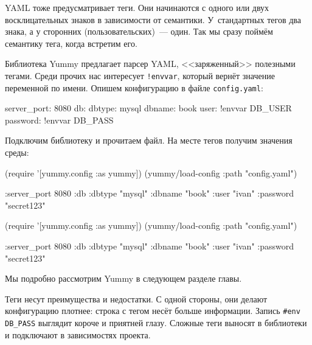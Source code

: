 YAML тоже предусматривает теги. Они начинаются с одного или двух восклицательных
знаков в зависимости от семантики. У~стандартных тегов два знака, а у сторонних
(пользовательских)~--- один. Так мы сразу поймём семантику тега, когда встретим
его.


Библиотека Yummy предлагает парсер YAML, <<заряженный>> полезными тегами. Среди
прочих нас интересует \verb|!envvar|, который вернёт значение переменной по
имени. Опишем конфигурацию в файле \verb|config.yaml|:

\begin{english}
  \begin{yaml}
server_port: 8080
db:
  dbtype:   mysql
  dbname:   book
  user:     !envvar DB_USER
  password: !envvar DB_PASS
  \end{yaml}
\end{english}

Подключим библиотеку и прочитаем файл. На месте тегов получим значения среды:

\ifnarrow

\begin{english}
  \begin{clojure}
(require '[yummy.config :as yummy])
(yummy/load-config
  {:path "config.yaml"})

{:server_port 8080
 :db {:dbtype "mysql"
      :dbname "book"
      :user "ivan"
      :password "secret123"}}
  \end{clojure}
\end{english}

\else

\begin{english}
  \begin{clojure}
(require '[yummy.config :as yummy])
(yummy/load-config {:path "config.yaml"})

{:server_port 8080
 :db {:dbtype "mysql"
      :dbname "book"
      :user "ivan"
      :password "secret123"}}
  \end{clojure}
\end{english}
\fi


\noindent
Мы подробно рассмотрим Yummy в следующем разделе главы.

Теги несут преимущества и недостатки. С одной стороны, они делают конфигурацию
плотнее: строка с тегом несёт больше информации. Запись \verb|#env DB_PASS|
выглядит короче и приятней глазу. Сложные теги выносят в библиотеки и подключают
в зависимостях проекта.

